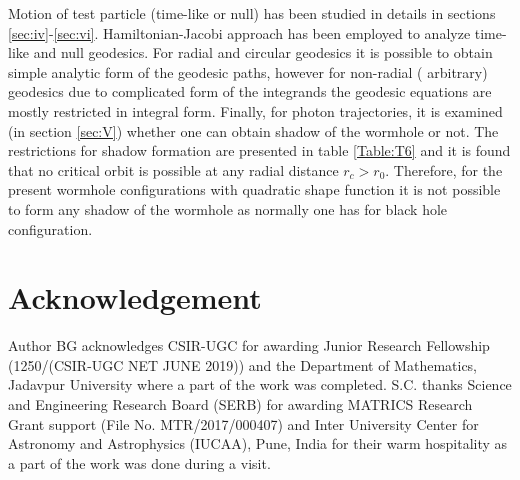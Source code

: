 \documentclass[10pt]{revtex4}
\begin{document}
\par 
Motion of test particle (time-like or null) has been studied in details in sections \ref{sec:iv}-\ref{sec:vi}. Hamiltonian-Jacobi approach has been employed to analyze time-like and null geodesics. For radial and circular geodesics it is possible to obtain simple analytic form of the geodesic paths, however for non-radial ( arbitrary) geodesics due to complicated form of the integrands the geodesic equations are mostly restricted in integral form. Finally, for photon trajectories, it is examined (in section \ref{sec:V}) whether one can obtain shadow of the wormhole or not. The restrictions for shadow formation are presented in table \ref{Table:T6} and it is found that no critical orbit is possible at any radial distance $r_c>r_0$. Therefore, for the present wormhole configurations with quadratic shape function it is not possible to form any shadow of the wormhole as normally one has for black hole configuration.

\section*{Acknowledgement}
Author BG acknowledges CSIR-UGC for awarding Junior Research Fellowship (1250/(CSIR-UGC NET JUNE 2019))
 and the Department of
Mathematics, Jadavpur University where a part of the work was completed. S.C. thanks Science and Engineering Research Board (SERB) for awarding
MATRICS Research Grant support (File No. MTR/2017/000407) and Inter University Center for
Astronomy and Astrophysics (IUCAA), Pune, India for their warm hospitality as a part of the work
was done during a visit.
\end{document}
